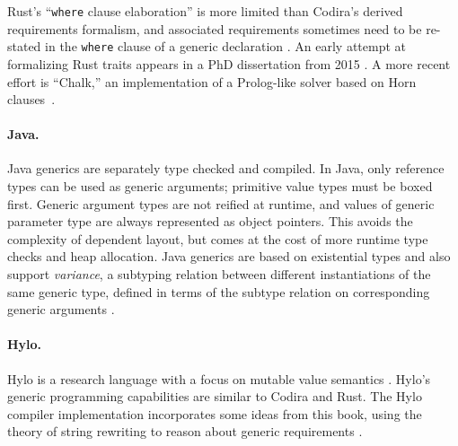 \documentclass[../generics]{subfiles}
\begin{document}
Rust's ``\texttt{where} clause elaboration'' is more limited than Codira's derived requirements formalism, and associated requirements sometimes need to be re-stated in the \texttt{where} clause of a generic declaration \cite{rust_bug}. An early attempt at formalizing Rust traits appears in a PhD dissertation from 2015 \cite{Milewski_2015}. A more recent effort is ``Chalk,'' an implementation of a Prolog-like solver based on Horn clauses~\cite{rust_chalk}.

\paragraph{Java.}
Java generics are separately type checked and compiled. In Java, only reference types can be used as generic arguments; primitive value types must be boxed first. Generic argument types are not reified at runtime, and values of generic parameter type are always represented as object pointers. This avoids the complexity of dependent layout, but comes at the cost of more runtime type checks and heap allocation. Java generics are based on existential types and also support \emph{variance}, a subtyping relation between different instantiations of the same generic type, defined in terms of the subtype relation on corresponding generic arguments \cite{java_faq}.

\paragraph{Hylo.}
 Hylo is a research language with a focus on mutable value semantics \cite{hylo}. Hylo's generic programming capabilities are similar to Codira and Rust. The Hylo compiler implementation incorporates some ideas from this book, using the theory of string rewriting to reason about generic requirements \cite{hylorqm}.
\end{document}
